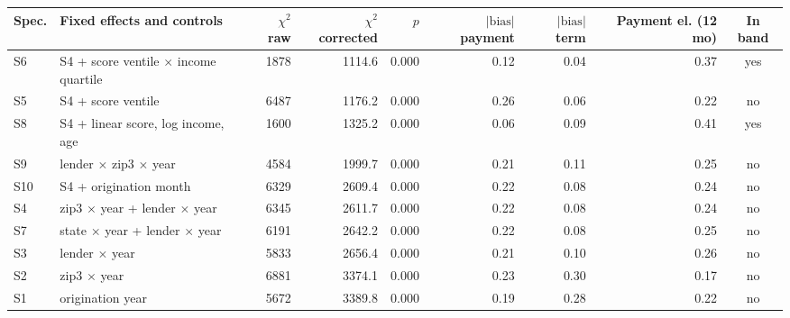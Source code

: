 \begin{tabular}{llrrrrrrc}
\toprule
Spec. & Fixed effects and controls & $\chi^2$ raw & $\chi^2$ corrected & $p$ & $|\text{bias}|$ payment & $|\text{bias}|$ term & Payment el. (12 mo) & In band \\
\midrule
S6 & S4 + score ventile $\times$ income quartile & 1878 & 1114.6 & 0.000 & 0.12 & 0.04 & 0.37 & yes \\
S5 & S4 + score ventile & 6487 & 1176.2 & 0.000 & 0.26 & 0.06 & 0.22 & no \\
S8 & S4 + linear score, log income, age & 1600 & 1325.2 & 0.000 & 0.06 & 0.09 & 0.41 & yes \\
S9 & lender $\times$ zip3 $\times$ year & 4584 & 1999.7 & 0.000 & 0.21 & 0.11 & 0.25 & no \\
S10 & S4 + origination month & 6329 & 2609.4 & 0.000 & 0.22 & 0.08 & 0.24 & no \\
S4 & zip3 $\times$ year + lender $\times$ year & 6345 & 2611.7 & 0.000 & 0.22 & 0.08 & 0.24 & no \\
S7 & state $\times$ year + lender $\times$ year & 6191 & 2642.2 & 0.000 & 0.22 & 0.08 & 0.25 & no \\
S3 & lender $\times$ year & 5833 & 2656.4 & 0.000 & 0.21 & 0.10 & 0.26 & no \\
S2 & zip3 $\times$ year & 6881 & 3374.1 & 0.000 & 0.23 & 0.30 & 0.17 & no \\
S1 & origination year & 5672 & 3389.8 & 0.000 & 0.19 & 0.28 & 0.22 & no \\
\bottomrule
\end{tabular}